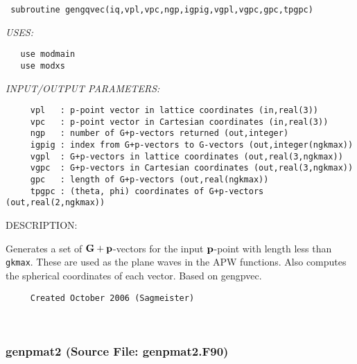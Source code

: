 \documentclass[11pt]{article}
\begin{document}
\begin{verbatim} subroutine gengqvec(iq,vpl,vpc,ngp,igpig,vgpl,vgpc,gpc,tpgpc)\end{verbatim}{\em USES:}
\begin{verbatim}   use modmain
   use modxs\end{verbatim}{\em INPUT/OUTPUT PARAMETERS:}
\begin{verbatim}     vpl   : p-point vector in lattice coordinates (in,real(3))
     vpc   : p-point vector in Cartesian coordinates (in,real(3))
     ngp   : number of G+p-vectors returned (out,integer)
     igpig : index from G+p-vectors to G-vectors (out,integer(ngkmax))
     vgpl  : G+p-vectors in lattice coordinates (out,real(3,ngkmax))
     vgpc  : G+p-vectors in Cartesian coordinates (out,real(3,ngkmax))
     gpc   : length of G+p-vectors (out,real(ngkmax))
     tpgpc : (theta, phi) coordinates of G+p-vectors (out,real(2,ngkmax))\end{verbatim}
{\sf DESCRIPTION:\\ }


     Generates a set of ${\bf G+p}$-vectors for the input ${\bf p}$-point with
     length less than {\tt gkmax}. These are used as the plane waves in the APW
     functions. Also computes the spherical coordinates of each vector.
     Based on gengpvec.
  
\begin{verbatim}     Created October 2006 (Sagmeister)\end{verbatim}






 
 
\mbox{}\hrulefill\ 
 
\subsubsection{genpmat2 (Source File: genpmat2.F90)}
\end{document}
